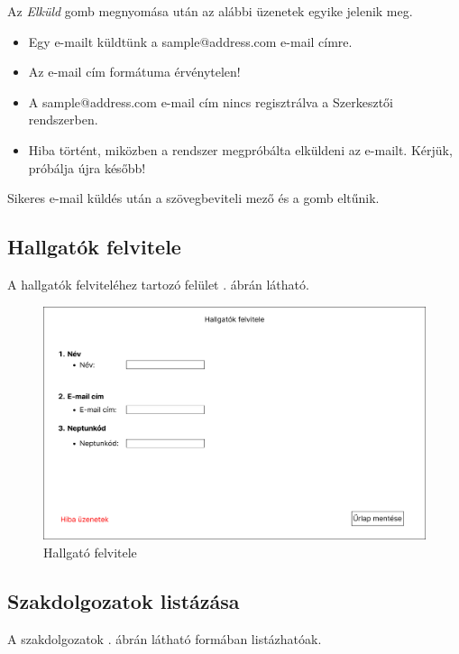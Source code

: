 \documentclass[a4paper,12pt]{article}
\begin{document}
Az \textit{Elküld} gomb megnyomása után az alábbi üzenetek egyike jelenik meg.
\begin{itemize}
	\item Egy e-mailt küldtünk a sample@address.com e-mail címre.
	\item Az e-mail cím formátuma érvénytelen!
	\item A sample@address.com e-mail cím nincs regisztrálva a Szerkesztői rendszerben.
	\item Hiba történt, miközben a rendszer megpróbálta elküldeni az e-mailt. Kérjük, próbálja újra később!
\end{itemize}

Sikeres e-mail küldés után a szövegbeviteli mező és a gomb eltűnik.

\subsection{Hallgatók felvitele}

A hallgatók felviteléhez tartozó felület . ábrán látható.

\begin{figure}[h!]
	\centering
	\includegraphics[width=\textwidth]{images/Web_pages/Enrollment_of_students.png}
	\caption{Hallgató felvitele}
	\label{fig:Enrollment_of_students}
\end{figure}

\subsection{Szakdolgozatok listázása}

A szakdolgozatok . ábrán látható formában listázhatóak.
\end{document}
